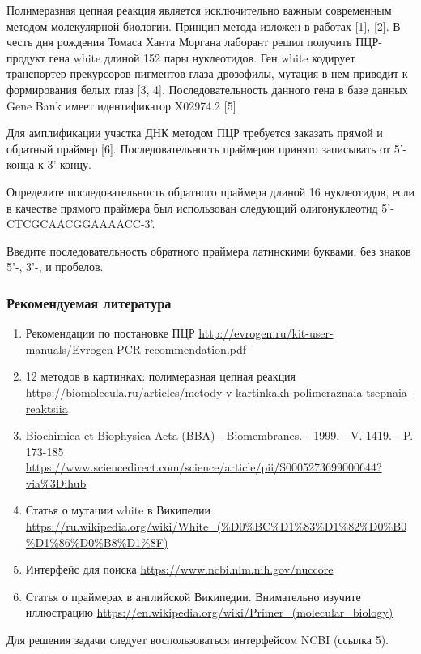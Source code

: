 
Полимеразная цепная реакция является исключительно важным современным методом молекулярной биологии. Принцип метода изложен в работах [1], [2].
В честь дня рождения Томаса Ханта Моргана лаборант решил получить ПЦР-продукт гена white длиной 152 пары нуклеотидов. Ген white кодирует транспортер прекурсоров пигментов глаза дрозофилы, мутация в нем приводит к формирования белых глаз [3, 4]. Последовательность данного гена в базе данных Gene Bank имеет идентификатор X02974.2 [5]

Для амплификации участка ДНК методом ПЦР требуется заказать прямой и обратный праймер [6]. Последовательность праймеров принято записывать от 5'-конца к 3'-концу. 

Определите последовательность обратного праймера длиной 16 нуклеотидов, если в качестве прямого праймера был использован следующий олигонуклеотид 5'- CTCGCAACGGAAAACC-3'.

Введите последовательность обратного праймера латинскими буквами, без знаков 5'-, 3'-, и пробелов.

\subsubsection*{Рекомендуемая литература}

\begin{enumerate}
    \item Рекомендации по постановке ПЦР \url{http://evrogen.ru/kit-user-manuals/Evrogen-PCR-recommendation.pdf}
    \item 12 методов в картинках: полимеразная цепная реакция \url{https://biomolecula.ru/articles/metody-v-kartinkakh-polimeraznaia-tsepnaia-reaktsiia}
    \item Biochimica et Biophysica Acta (BBA) - Biomembranes. - 1999. - V. 1419. - P. 173-185\\ \url{https://www.sciencedirect.com/science/article/pii/S0005273699000644?via%3Dihub}
    \item Статья о мутации white в Википедии \url{https://ru.wikipedia.org/wiki/White_(%D0%BC%D1%83%D1%82%D0%B0%D1%86%D0%B8%D1%8F)}
    \item Интерфейс для поиска \url{https://www.ncbi.nlm.nih.gov/nuccore}
    \item Статья о праймерах в английской Википедии. Внимательно изучите иллюстрацию \url{https://en.wikipedia.org/wiki/Primer_(molecular_biology)}
\end{enumerate}

\explanationSection

Для решения задачи следует воспользоваться интерфейсом NCBI (ссылка 5). 

